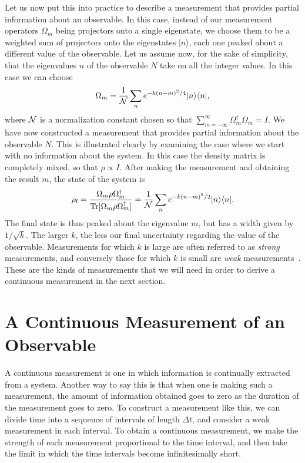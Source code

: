 \documentclass[aps,twocolumn,superscriptaddress,footinbib,floatfix,showpacs]{revtex4}
\begin{document}
Let us now put this into practice to describe a measurement that
provides partial information about an observable. In this case,
instead of our measurement operators $\Omega_m$ being projectors
onto a single eigenstate, we choose them to be a weighted sum of
projectors onto the eigenstates $|n\rangle$, each one peaked about
a different value of the observable. Let us assume now, for the
sake of simplicity, that the eigenvalues $n$ of the observable
$N$ 
take on all the integer values. In this case we can choose
\begin{equation}
   \Omega_m = \frac{1}{\cal N} \sum_{n} e^{-k(n-m)^2/4} |n\rangle\langle
   n| ,
\end{equation}
where ${\cal N}$ is a normalization constant chosen so
that $\sum_{m=-\infty}^\infty \Omega_m^\dagger\Omega_m = I$. We have now
constructed a measurement that provides partial information about
the observable $N$. This is illustrated clearly by examining the
case where we start with no information about the system. In this case 
the density matrix is completely mixed, so that $\rho \propto I$.
After making the measurement and obtaining the result $m$, the
state of the system is
\begin{equation}
  \rho_{\mbox{\scriptsize f}} = 
   \frac{\Omega_m \rho \Omega_m^\dagger }{\mbox{Tr}[\Omega_m \rho \Omega_m^\dagger 
   ]} = \frac{1}{\cal N} \sum_{n} e^{-k(n-m)^2/2} |n\rangle\langle
   n| .
\end{equation}
The final state is thus peaked about the eigenvalue $m$, but has a
width given by $1/\sqrt{k}$. The larger $k$, the less our final
uncertainty regarding the value of the observable. Measurements
for which $k$ is large are often referred to as {\em strong}
measurements, and conversely those for which $k$ is small are {\em
weak} measurements~\cite{FJ}. These are the kinds of measurements that we
will need in order to derive a continuous measurement in the next
section.

\section{A Continuous Measurement of an Observable}
\label{section:continuousmeasurement}

A continuous measurement is one in which information is
continually extracted from a system. Another way to say this is
that when one is making such a measurement, the amount of
information obtained goes to zero as the duration of the
measurement goes to zero. To construct a measurement like this, we
can divide time into a sequence of intervals of length $\Delta t$,
and consider a weak measurement in each interval. To obtain a
continuous measurement, we make the strength of each measurement
proportional to the time interval, and then take the limit in
which the time intervals become infinitesimally short.
\end{document}
